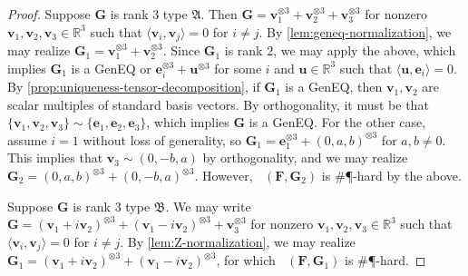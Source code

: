 \documentclass[11pt]{article}
\DeclareMathOperator{\holts}{Holant^*_3}
\newcommand{\geneq}{\textsf{GenEQ}\xspace}
\newcommand{\sph}{\#\P-hard\xspace}
\newcommand{\teh}{^{\otimes 3}}
\newcommand{\ternarytractgeneq}{$\mathfrak{A}$\xspace}
\newcommand{\ternarytractz}{$\mathfrak{B}$\xspace}
\begin{document}
\begin{proof}
  Suppose $\mathbf{G}$ is rank $3$ type \ternarytractgeneq.
  Then $\mathbf{G} = \mathbf{v}_1\teh + \mathbf{v}_2\teh + \mathbf{v}_3\teh$ for nonzero $\mathbf{v}_1, \mathbf{v}_2, \mathbf{v}_3 \in \mathbb{R}^3$ such that $\langle \mathbf{v}_i, \mathbf{v}_j \rangle = 0$ for $i \ne j$.
  By \cref{lem:geneq-normalization}, we may realize $\mathbf{G}_1 = \mathbf{v}_1\teh + \mathbf{v}_2\teh$.
  Since $\mathbf{G}_1$ is rank $2$, we may apply the above, which implies $\mathbf{G}_1$ is a \geneq or $\mathbf{e}_i\teh + \mathbf{u}\teh$ for some $i$ and $\mathbf{u} \in \mathbb{R}^3$ such that $\langle \mathbf{u}, \mathbf{e}_i \rangle = 0$.
  By \cref{prop:uniqueness-tensor-decomposition}, if $\mathbf{G}_1$ is a \geneq, then $\mathbf{v}_1, \mathbf{v}_2$ are scalar multiples of standard basis vectors.
  By orthogonality, it must be that $\{\mathbf{v}_1, \mathbf{v}_2, \mathbf{v}_3\} \sim \{\mathbf{e}_1, \mathbf{e}_2, \mathbf{e}_3\}$, which implies $\mathbf{G}$ is a \geneq.
  For the other case, assume $i = 1$ without loss of generality, so $\mathbf{G}_1 = \mathbf{e}_1\teh + (0, a, b)\teh$ for $a, b \ne 0$.
  This implies that $\mathbf{v}_3 \sim (0, -b, a)$ by orthogonality, and we may realize $\mathbf{G}_2 = (0, a, b)\teh + (0, -b, a)\teh$.
  However, $\holts(\mathbf{F}, \mathbf{G}_2)$ is \sph by the above.

  Suppose $\mathbf{G}$ is rank $3$ type \ternarytractz.
  We may write $\mathbf{G} = (\mathbf{v}_1 + i \mathbf{v}_2) \teh + (\mathbf{v}_1 - i \mathbf{v}_2)\teh + \mathbf{v}_3\teh$ for nonzero $\mathbf{v}_1, \mathbf{v}_2, \mathbf{v}_3 \in \mathbb{R}^3$ such that $\langle \mathbf{v}_i, \mathbf{v}_j \rangle = 0$ for $i \ne j$.
  By \cref{lem:Z-normalization}, we may realize $\mathbf{G}_1 = (\mathbf{v}_1 + i \mathbf{v}_2)\teh + (\mathbf{v}_1 - i \mathbf{v}_2)\teh$, for which $\holts(\mathbf{F}, \mathbf{G}_1)$ is \sph.
\end{proof}
\end{document}
